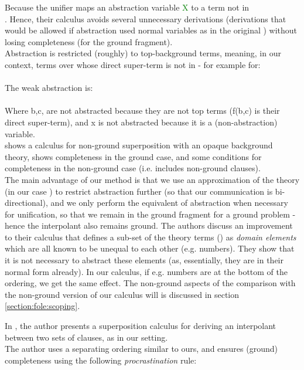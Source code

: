 \noindent
Because the unifier maps an abstraction variable \textcolor{green}{X} to a term not in \\\langb.
Hence, their calculus avoids several unnecessary derivations (derivations that would be allowed if abstraction used normal variables as in  the original \cite{DBLP:journals/aaecc/BachmairGW94}) without losing completeness (for the ground fragment).\\
Abstraction is restricted (roughly) to top-background terms, meaning, in our context, terms over \langb{} whose direct super-term is not in \langb{} - for example for:\\
\\
The weak abstraction is:\\
\\
Where b,c, are not abstracted because they are not top  terms (f(b,c) is their direct super-term), 
and x is not abstracted because it is a (non-abstraction) variable.\\
\cite{BaumgartnerWaldmann13} shows a calculus for non-ground superposition with an opaque background theory, 
shows completeness in the ground case, and some conditions for completeness in the non-ground case (i.e.  includes non-ground clauses).\\
The main advantage of our method is that we use an approximation of the theory (in our case ) to restrict abstraction further 
(so that our communication is bi-directional), and we only perform the equivalent of abstraction when necessary for unification, 
so that we remain in the ground fragment for a ground problem - hence the interpolant also remains ground.
The authors discuss an improvement to their calculus that defines a sub-set of the theory terms (\langb) 
as \emph{domain elements} which are all known to be unequal to each other (e.g. numbers). 
They show that it is not necessary to abstract these elements (as, essentially, they are in their normal form already). 
In our calculus, if e.g. numbers are at the bottom of the ordering, we get the same effect.
The non-ground aspects of the comparison with the non-ground version of our calculus will is discussed in section \ref{section:fole:scoping}.


\bigskip

\noindent
In \cite{McMillan08}, the author presents a superposition calculus for deriving an interpolant between two sets of clauses, as in our setting.\\
The author uses a separating ordering similar to ours, and ensures (ground) completeness using the following \emph{procrastination} rule:

